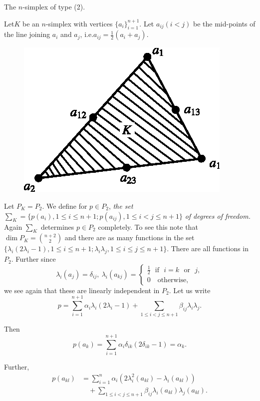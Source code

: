 \begin{example}\label{chap4-exam4.2}
The $n$-simplex of type (2).


Let\pageoriginale $K$ be an $n$-simplex with vertices
$\{a_{i}\}^{n+1}_{i=1}$. Let 
$a_{ij}(i<j)$ be the mid-points of the line joining $a_{i}$ and
$a_{j}$, i.e.\@ $a_{ij}=\frac{1}{2}(a_{i}+a_{j})$. 
\begin{figure}[H]
\centering
\includegraphics{figure/fig4.1.eps}
\caption{}\label{chap4-fig4.1}
\end{figure}

Let $P_{K}=P_{2}$. We define for $p\in P_{2}$, {\em the set}
$\sum_{K}=\{p(a_{i}), 1\leq i\leq n+1; p(a_{ij}), 1\leq i<j\leq n+1\}$
{\em of degrees of freedom.} Again $\sum_{K}$ determines $p\in P_{2}$
completely. To see this note that $\dim P_{K}=\binom{n+2}{2}$ and
there are as many functions in the set $\{\lambda_{i}(2\lambda_{i}-1),
1\leq i\leq n+1; \lambda_{i}\lambda_{j},1\leq i\leq j\leq
n+1\}$. There are all functions in $P_{2}$. Further since
$$ 
\lambda_{i}(a_{j})=\delta_{ij},\ \lambda_{i}(a_{kj})=
\begin{cases}
\frac{1}{2}\text{~ if~ } i=k\text{~ or~ }j,\\
0\quad \text{otherwise,}
\end{cases}
$$
we see again that these are linearly independent in $P_{2}$. Let us
write
$$
p=\sum^{n+1}_{i=1}\alpha_{i}\lambda_{i}(2\lambda_{i}-1)+\sum_{1\leq
  i<j\leq n+1}\beta_{ij}\lambda_{i}\lambda_{j}.
$$

Then 
$$
p(a_{k})=\sum^{n+1}_{i=1}\alpha_{i}\delta_{ik}(2\delta_{ik}-1)=\alpha_{k}.
$$

Further,
\begin{align*}
p(a_{kl}) &=
\sum^{n}_{i=1}\alpha_{i}(2\lambda^{2}_{i}(a_{kl})-\lambda_{i}(a_{kl}))\\ 
&\quad +\sum_{1\leq i<j\leq
  n+1}\beta_{ij}\lambda_{i}(a_{kl})\lambda_{j}(a_{kl}). 
\end{align*}


\end{example}
